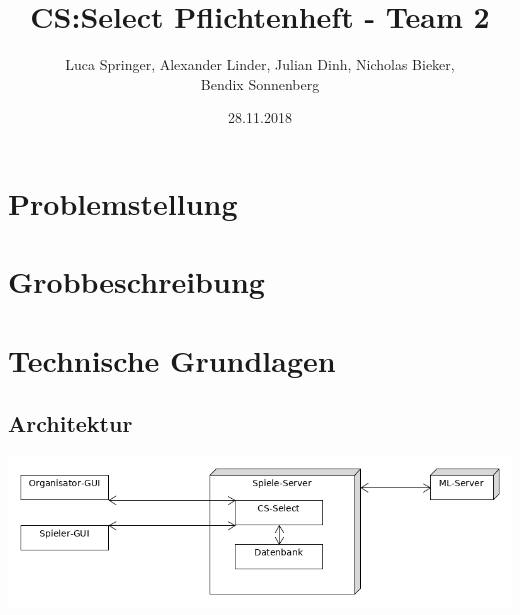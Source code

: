 \documentclass[xcolor=dvipsnames]{beamer}
\title[Team 2 - Pflichtenheft]{CS:Select Pflichtenheft - Team 2}
\author{Luca Springer, Alexander Linder, Julian Dinh, Nicholas Bieker,\\ Bendix Sonnenberg}
\date{28.11.2018}
\begin{document}
\begin{frame} %
  \titlepage
\end{frame}
\section{Problemstellung}
\section{Grobbeschreibung}
\section{Technische Grundlagen}
\subsection{Architektur}
\begin{frame}
\center
\includegraphics[width=(\textwidth) - 2cm]{../uml/export/Architektur.png}
\end{frame}
\end{document}
